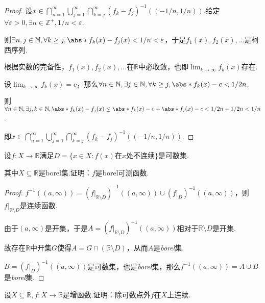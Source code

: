 \begin{proof}
    设\(x \in \bigcap_{n=1}^\infty \bigcup_{j=1}^\infty \bigcap_{k=j}^\infty (f_k-f_j)^{-1}((-1/n, 1/n))\).给定\(\forall \varepsilon>0, \exists n \in \mathbb{Z}^+, 1/n<\varepsilon\).

    则\(\exists n,j \in \mathbb{N}, \forall k \geq j, \abs*{f_k(x)-f_j(x)}<1/n<\varepsilon\)，于是\(f_1(x), f_2(x), \dots\)是柯西序列.

    根据{\kaishu 实数的完备性}，\(f_1(x), f_2(x), \dots\)在\(\mathbb{R}\)中必收敛，也即\(\lim_{k \to \infty}f_k(x)\)存在.

    设\(\lim_{k \to \infty}f_k(x)=c\)，那么\(\forall n \in \mathbb{N}, \exists j \in \mathbb{N}, \forall k \geq j, \abs*{f_k(x)-c}<1/2n\).

    则\(\forall n \in \mathbb{N}, \exists j,k \in \mathbb{N}, \abs*{f_k(x)-f_j(x)} \leq \abs*{f_k(x)-c}+\abs*{f_j(x)-c}< 1/2n+1/2n<1/n\).
    
    即\(x \in \bigcap_{n=1}^\infty \bigcup_{j=1}^\infty \bigcap_{k=j}^\infty (f_k-f_j)^{-1}((-1/n, 1/n))\).
\end{proof}

\begin{problem}[17]\label{2.B.17}
    设\(f: X \to \mathbb{R}\)满足\(D=\{x \in X: f(x) \text{在} x \text{处不连续}\}\)是可数集.

    其中\(X \subseteq \mathbb{R}\)是borel集.证明：\(f\)是borel可测函数.
\end{problem}

\begin{proof}
    \(f^{-1}((a,\infty))=(\left.f\right|_{\mathbb{R} \setminus D})^{-1}((a,\infty)) \cup (\left.f\right|_{D})^{-1}((a,\infty))\)，则\(\left.f\right|_{\mathbb{R} \setminus D}\)是连续函数.
    
    由于\((a,\infty)\)是开集，于是\(A=(\left.f\right|_{\mathbb{R} \setminus D})^{-1}((a,\infty))\)相对于\(\mathbb{R} \setminus D\)是开集.

    故存在\(\mathbb{R}\)中开集\(G\)使得\(A=G \cap (\mathbb{R} \setminus D)\)，从而\(A\)是\textit{borel}集.
    
    \(B=(\left.f\right|_{D})^{-1}((a,\infty))\)是可数集，也是\textit{borel}集，那么\(f^{-1}((a,\infty))=A \cup B\)是\textit{borel}集.
\end{proof}

\newpage

\begin{problem}[2.B.22]\label{1.C.3}
    设\(X \subseteq \mathbb{R}, f: X \to \mathbb{R}\)是增函数.证明：除可数点外\(f\)在\(X\)上连续.
\end{problem}

